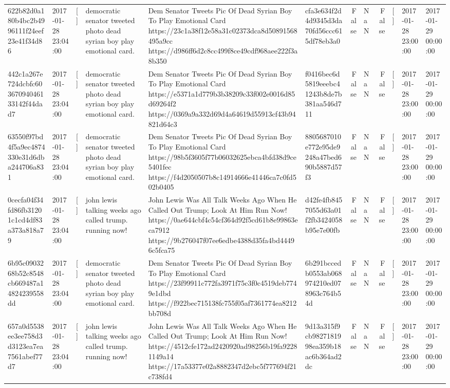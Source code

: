 \begin{tabular}{llllllrlrlll}
622b82d0a180b4bc2b4996111f24eef23e41f34d86 & 2017-01-28 23:04:00 & [] & democratic senator tweeted photo dead syrian boy play emotional card. & Dem Senator Tweets Pic Of Dead Syrian Boy To Play Emotional Card https://23c1a38f12e58a31c02373dca8d50891568495a9cc https://d986ff6d2c8cc499f8ce49cdf968aee222f3a8b350 & cfa3e634f2d4d9345d3da70fd56ccc615df78eb3a0 & False & NaN & False & [] & 2017-01-28 23:00:00 & 2017-01-29 00:00:00 \\
442c1a267e724dcbfc60367094046133142f44dad7 & 2017-01-28 23:04:00 & [] & democratic senator tweeted photo dead syrian boy play emotional card. & Dem Senator Tweets Pic Of Dead Syrian Boy To Play Emotional Card https://e5371a1d779b3b38209c33f002e0016d85d69264f2 https://0369a9a332d69d4a64619d55913cf43b94821d64c3 & f0416bec6d5819eeebc41243b8de7b381aa546d711 & False & NaN & False & [] & 2017-01-28 23:00:00 & 2017-01-29 00:00:00 \\
63550f97bd4f5a9ec4874330e31d6dba244706a831 & 2017-01-28 23:04:00 & [] & democratic senator tweeted photo dead syrian boy play emotional card. & Dem Senator Tweets Pic Of Dead Syrian Boy To Play Emotional Card https://98b5f3605f77b06032625ebca4bfd38d9ce5401fec https://f4d2050507b8c14914666e41446ca7c0fd502b0405 & 8805687010e772e95de9248a47bed690b5887d57f3 & False & NaN & False & [] & 2017-01-28 23:00:00 & 2017-01-29 00:00:00 \\
0cecfa04f34fd86fb31201c1cd4df83a373a818a79 & 2017-01-28 23:04:00 & [] & john lewis talking weeks ago called trump. running now! & John Lewis Was All Talk Weeks Ago When He Called Out Trump; Look At Him Run Now! https://0ae644cbf4c54cf364d92f5cd61b8e99863eca7912 https://9b276047f07ee6edbe4388d35fa4bd44496c5fca75 & d42fe4fb8457055d63a01f2fb3424058b95e7e00fb & False & NaN & False & [] & 2017-01-28 23:00:00 & 2017-01-29 00:00:00 \\
6b95c0903268b52c8548cb669487a14824239558dd & 2017-01-28 23:04:00 & [] & democratic senator tweeted photo dead syrian boy play emotional card. & Dem Senator Tweets Pic Of Dead Syrian Boy To Play Emotional Card https://23f99911c772fa3971f75c3f0c4519deb7749e1dbd https://f922bec715138fc755f05af7361774ea8212bb708d & 6b291bccedb0553ab068974210ed078963c764b54d & False & NaN & False & [] & 2017-01-28 23:00:00 & 2017-01-29 00:00:00 \\
657a0d5538ee3ee758d3d3123ea7ea7561abef77d7 & 2017-01-28 23:04:00 & [] & john lewis talking weeks ago called trump. running now! & John Lewis Was All Talk Weeks Ago When He Called Out Trump; Look At Him Run Now! https://4512cfe172ad2420920ad98256b19fa92281149a14 https://17a53377e02a8882347d2ebc5f777694f21c738fd4 & 9d13a315f9cb9827181998ea359b18ac6b364ad2dc & False & NaN & False & [] & 2017-01-28 23:00:00 & 2017-01-29 00:00:00 \\

\end{tabular}
